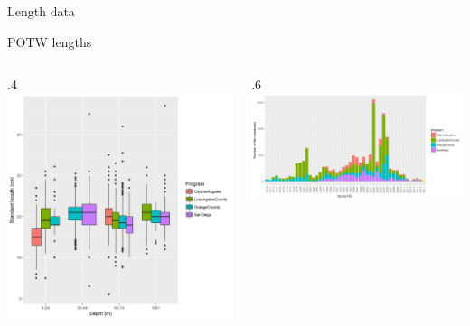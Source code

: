 \documentclass[ignorenonframetext,]{beamer}
\def\begincols{\begin{columns}}
\def\begincol{\begin{column}}
\def\endcol{\end{column}}
\def\endcols{\end{columns}}
\begin{document}
\begin{frame}{Length data}

POTW lengths \begincols
 \begincol{.4\textwidth}
\includegraphics{Figures/Fleet7_Sanitation_lengthboxplots.png} \endcol
 \begincol{.6\textwidth}
\includegraphics{Figures/Fleet7_Sanitation_length_source.png}\\
\endcol
\endcols

\end{frame}
\end{document}
